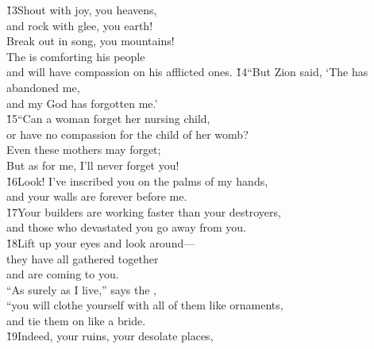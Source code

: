 \begin{poetry}
\poeml \v{13}Shout with joy, you heavens, \\
\poemll    and rock with glee, you earth! \\
\poemlll       Break out in song, you mountains! \\
\poeml The  is comforting his people \\
\poemll    and will have compassion on his afflicted ones.
\poeml \v{14}``But Zion said, `The  has abandoned me, \\
\poemll    and my God has forgotten me.' \\
\poeml \v{15}``Can a woman forget her nursing child, \\
\poemll    or have no compassion for the child of her womb? \\
\poeml Even these mothers may forget; \\
\poemll    But as for me, I'll never forget you! \\
\poeml \v{16}Look! I've inscribed you on the palms of my hands, \\
\poemll    and your walls are forever before me. \\
\poeml \v{17}Your builders are working faster than your destroyers, \\
\poemll    and those who devastated you go away from you. \\
\poeml \v{18}Lift up your eyes and look around--- \\
\poemll    they have all gathered together \\
\poemlll       and are coming to you. \\
\poeml ``As surely as I live,'' says the , \\
\poemll    ``you will clothe yourself with all of them like ornaments, \\
\poemlll       and tie them on like a bride. \\
\poeml \v{19}Indeed, your ruins, your desolate places, \\

\end{poetry}
